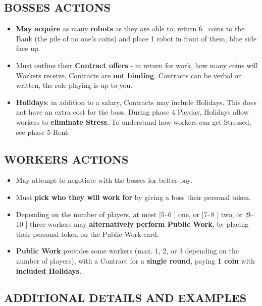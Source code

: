     \subsection{BOSSES ACTIONS}
    
        \begin{itemize}
            \item \textbf{May acquire} as many \textbf{robots} as they are able to; return 6 \faRubleSign\ coins to the Bank
            (the pile of no one's coins) and place 1 robot in front of them, blue side face
            up.
            \item Must outline their \textbf{Contract offers} - in return for work, how many coins will
            Workers receive. Contracts are \textbf{not binding}. Contracts can be verbal or written,
            the role playing is up to you.
            \item \textbf{Holidays}: in addition to a salary, Contracts may include Holidays. This does
            not have an extra cost for the boss. During phase 4 Payday, Holidays allow
            workers to \textbf{eliminate Stress}. To understand how workers can get Stressed,
            see phase 5 Rent.
        \end{itemize}
        
    \subsection{WORKERS ACTIONS}
    
        \begin{itemize}
            \item May attempt to negotiate with the bosses for better pay.
            \item Must \textbf{pick who they will work for} by giving a boss their personal token.
            \item Depending on the number of players, at most [5–6 \faPeopleGroup] one, or [7–8 \faPeopleGroup] two,
            or [9–10 \faPeopleGroup] three workers may \textbf{alternatively perform Public Work}, by placing their
            personal token on the Public Work card.
            \item \textbf{Public Work} provides some workers (max. 1, 2, or 3 depending on the number
            of players), with a Contract for a \textbf{single round}, paying \textbf{1 coin} with \textbf{included Holidays}.
        \end{itemize}
            
    \subsection{ADDITIONAL DETAILS AND EXAMPLES}
    
